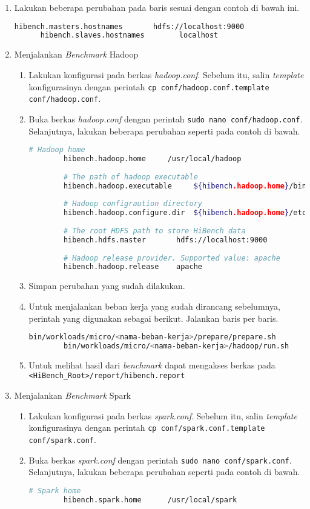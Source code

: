 \begin{enumerate}
  \item Lakukan beberapa perubahan pada baris sesuai dengan contoh di bawah ini.
    \begin{lstlisting}[language=bash]
	  hibench.masters.hostnames       hdfs://localhost:9000
	  hibench.slaves.hostnames        localhost
    \end{lstlisting}
  \item Menjalankan \textit{Benchmark} Hadoop
  \begin{enumerate}
    \item Lakukan konfigurasi pada berkas \textit{hadoop.conf}. Sebelum itu, salin \textit{template} konfigurasinya dengan perintah \verb|cp conf/hadoop.conf.template conf/hadoop.conf|.
    \item Buka berkas \textit{hadoop.conf} dengan perintah \verb|sudo nano conf/hadoop.conf|. Selanjutnya, lakukan beberapa perubahan seperti pada contoh di bawah.
      \begin{lstlisting}[language=bash]
		# Hadoop home
		hibench.hadoop.home     /usr/local/hadoop
		
		# The path of hadoop executable
		hibench.hadoop.executable     ${hibench.hadoop.home}/bin/hadoop
		
		# Hadoop configraution directory
		hibench.hadoop.configure.dir  ${hibench.hadoop.home}/etc/hadoop
		
		# The root HDFS path to store HiBench data
		hibench.hdfs.master       hdfs://localhost:9000
		
		# Hadoop release provider. Supported value: apache
		hibench.hadoop.release    apache
      \end{lstlisting}
    \item Simpan perubahan yang sudah dilakukan.
    \item Untuk menjalankan beban kerja yang sudah dirancang sebelumnya, perintah yang digunakan sebagai berikut. Jalankan baris per baris.
      \begin{lstlisting}[language=bash]
	    bin/workloads/micro/<nama-beban-kerja>/prepare/prepare.sh
	    bin/workloads/micro/<nama-beban-kerja>/hadoop/run.sh
      \end{lstlisting}
    \item Untuk melihat hasil dari \textit{benchmark} dapat mengakses berkas pada \verb|<HiBench_Root>/report/hibench.report|
  \end{enumerate}
  \item Menjalankan \textit{Benchmark} Spark
  \begin{enumerate}
    \item Lakukan konfigurasi pada berkas \textit{spark.conf}. Sebelum itu, salin \textit{template} konfigurasinya dengan perintah \verb|cp conf/spark.conf.template conf/spark.conf|.
    \item Buka berkas \textit{spark.conf} dengan perintah \verb|sudo nano conf/spark.conf|. Selanjutnya, lakukan beberapa perubahan seperti pada contoh di bawah.
      \begin{lstlisting}[language=bash]
		# Spark home
		hibench.spark.home      /usr/local/spark
		

\end{lstlisting}
\end{enumerate}
\end{enumerate}
